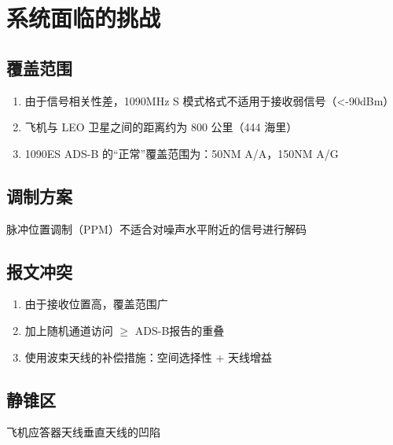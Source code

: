 
\chapter{系统面临的挑战}

\section{覆盖范围}

\begin{enumerate}
    \item 由于信号相关性差，1090MHz S 模式格式不适用于接收弱信号（<-90dBm）
    \item 飞机与 LEO 卫星之间的距离约为 800 公里（444 海里）
    \item 1090ES ADS-B 的“正常”覆盖范围为：50NM A/A，150NM A/G
\end{enumerate}

\section{调制方案}

脉冲位置调制（PPM）不适合对噪声水平附近的信号进行解码

\section{报文冲突}

\begin{enumerate}
    \item 由于接收位置高，覆盖范围广
    \item 加上随机通道访问 $\geq$ ADS-B报告的重叠
    \item 使用波束天线的补偿措施：空间选择性 + 天线增益
\end{enumerate}

\section{静锥区}

飞机应答器天线垂直天线的凹陷